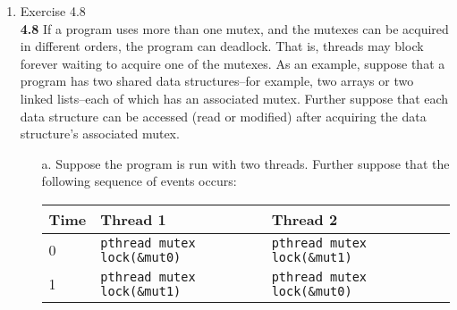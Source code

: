 \documentclass[11pt,epsfig,letterpaper]{article}
\begin{document}
\begin{enumerate}
\begin{center}
            \end{center}

            \quad The semaphore run performs about $50\%$ worse for a single thread, but the speedup curve is much steeper for the semaphore experiment, and consequently the efficiency holds up much better than for the mutex lock, such that the fastest time in any of the runs is held by the semaphore experiment for 8 cores.

            \quad This leads me to conclude that a semaphore-based solution scales much better in this use case. Why that is, I am unsure. What is the relative overhead of a semaphore and a mutex lock? What is the penalty for waiting for a mutex lock and how does it compare to the penalty for sitting at {\tt sem\_wait}?

            \quad I'd like to note that after having run the experiment with no guards around the critical section at all, the control run with one thread ran about twice as fast as the semaphore run, but with 8 cores, the semaphore run was only $10\%$ slower. That seems like remarkably low overhead for the small benefit of making the data race-free. Why is the semaphore based solution so scalable here?\footnote{Code for these ex.: \url{https://github.com/lovercast/DS-A/blob/main/dist/pthreads/calcpi.c}}
            \vspace{0.5pc}

            \item Exercise 4.8 \\
            {\bf 4.8}\>\> If a program uses more than one mutex, and the mutexes can be acquired in different orders, the program can deadlock. That is, threads may block forever waiting to acquire one of the mutexes. As an example, suppose that a program has two shared data structures–for example, two arrays or two linked lists–each of which has an associated mutex. Further suppose that each data structure can be accessed (read or modified) after acquiring the data structure’s associated mutex.
            \begin{enumerate}

            \item[a.] Suppose the program is run with two threads. Further suppose that the following sequence of events occurs:

            \begin{center}
            \begin{tabular}{| l | l | l | p{10cm} | } \hline
            Time & Thread 1 & Thread 2 \\ \hline
            0 & {\tt pthread mutex lock(\&mut0)} & {\tt pthread mutex lock(\&mut1)} \\ \hline
            1 & {\tt pthread mutex lock(\&mut1)} & {\tt pthread mutex lock(\&mut0)} \\ \hline
            \end{tabular}
            \end{center}


\end{enumerate}
\end{enumerate}
\end{document}
